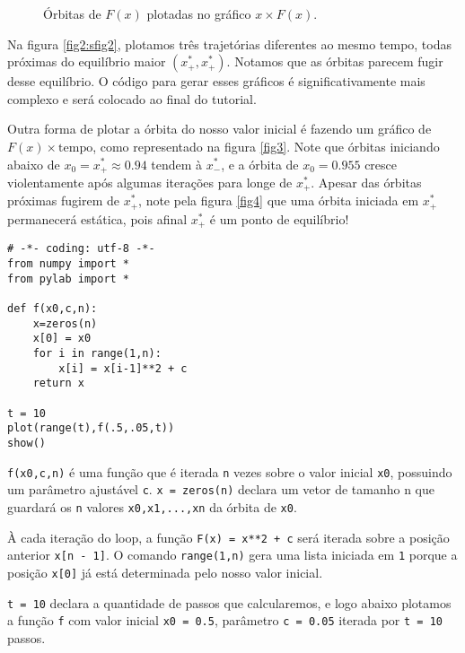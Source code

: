 \documentclass{article}
\begin{document}
\begin{figure}
\centering
{}
\caption{Órbitas de $F(x)$ plotadas no gráfico $x \times F(x)$.}
\label{fig2}
\end{figure}

Na figura \ref{fig2:sfig2}, plotamos três trajetórias diferentes ao mesmo tempo, todas próximas do equilíbrio maior $(x^*_+,x^*_+)$. Notamos que as órbitas parecem fugir desse equilíbrio. O código para gerar esses gráficos é significativamente mais complexo e será colocado ao final do tutorial.

Outra forma de plotar a órbita do nosso valor inicial é fazendo um gráfico de $F(x) \times \textrm{tempo}$, como representado na figura \ref{fig3}. Note que órbitas iniciando abaixo de $x_0 = x^*_+ \approx 0.94$ tendem à $x^*_-$, e a órbita de $x_0 = 0.955$ cresce violentamente após algumas iterações para longe de $x^*_+$. Apesar das órbitas próximas fugirem de $x^*_+$, note pela figura \ref{fig4} que uma órbita iniciada em $x^*_+$ permanecerá estática, pois afinal $x^*_+$ é um ponto de equilíbrio! 

\begin{verbatim}
# -*- coding: utf-8 -*-
from numpy import *
from pylab import *

def f(x0,c,n):
    x=zeros(n)
    x[0] = x0
    for i in range(1,n):
        x[i] = x[i-1]**2 + c
    return x 

t = 10
plot(range(t),f(.5,.05,t))
show()
\end{verbatim}

\texttt{f(x0,c,n)} é uma função que é iterada \texttt{n} vezes sobre o valor inicial \texttt{x0}, possuindo um parâmetro ajustável \texttt{c}. \texttt{x = zeros(n)} declara um vetor de tamanho n que guardará os \texttt{n} valores \texttt{x0,x1,...,xn} da órbita de \texttt{x0}.

À cada iteração do loop, a função \texttt{F(x) = x**2 + c} será iterada sobre a posição anterior \texttt{x[n - 1]}. O comando \texttt{range(1,n)} gera uma lista iniciada em \texttt{1} porque a posição \texttt{x[0]} já está determinada pelo nosso valor inicial.

\texttt{t = 10} declara a quantidade de passos que calcularemos, e logo abaixo plotamos a função \texttt{f} com valor inicial \texttt{x0 = 0.5}, parâmetro \texttt{c = 0.05} iterada por \texttt{t = 10} passos.
\end{document}
